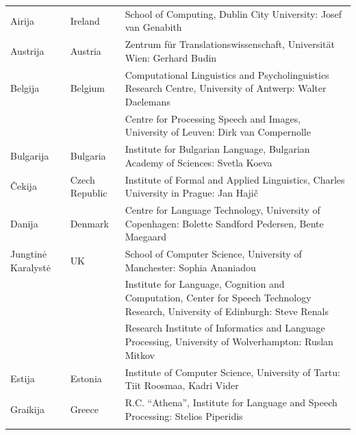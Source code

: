 \small
\begin{longtable}{llp{113mm}}
  Airija & \textcolor{grey1}{Ireland} & School of Computing, Dublin City University: Josef van Genabith\\ \addlinespace
  
  Austrija & \textcolor{grey1}{Austria} & Zentrum für Translationswissenschaft, Universität Wien: Gerhard Budin\\ \addlinespace
  
  Belgija & \textcolor{grey1}{Belgium} & Computational Linguistics and Psycholinguistics Research Centre, University of Antwerp: Walter Daelemans\\ \addlinespace
  & & Centre for Processing Speech and Images, University of Leuven: Dirk van Compernolle \\ \addlinespace
  
  Bulgarija & \textcolor{grey1}{Bulgaria} & Institute for Bulgarian Language, Bulgarian Academy of Sciences: Svetla Koeva \\ \addlinespace
  
  Čekija & \textcolor{grey1}{Czech Republic} & Institute of Formal and Applied Linguistics, Charles University in Prague: Jan Hajič \\ \addlinespace
  
  Danija &  \textcolor{grey1}{Denmark} & Centre for Language Technology, University of Copenhagen: \newline Bolette Sandford Pedersen, Bente Maegaard\\ \addlinespace
  
  Jungtinė Karalystė & \textcolor{grey1}{UK} & School of Computer Science, University of Manchester: Sophia Ananiadou \\ \addlinespace 
  & & Institute for Language, Cognition and Computation, Center for Speech Technology Research, University of Edinburgh: Steve Renals \\ \addlinespace 
  & & Research Institute of Informatics and Language Processing, University of Wolverhampton: Ruslan Mitkov \\ \addlinespace
  
  Estija & \textcolor{grey1}{Estonia} & Institute of Computer Science, University of Tartu: Tiit Roosmaa, Kadri Vider\\ \addlinespace
  
  Graikija & \textcolor{grey1}{Greece} & R.C. “Athena”, Institute for Language and Speech Processing: Stelios Piperidis\\ \addlinespace
  

\end{longtable}
